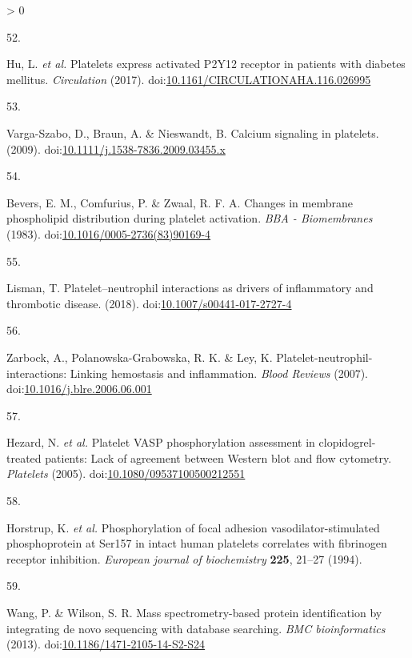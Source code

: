 \documentclass[11pt,twoside]{bristolthesis}
\newlength{\cslhangindent}
\newlength{\csllabelwidth}
\newenvironment{CSLReferences}[2] %
 {%
  \setlength{\parindent}{0pt}
  \ifodd #1 \everypar{\setlength{\hangindent}{\cslhangindent}}\ignorespaces\fi
  \ifnum #2 > 0
  \setlength{\parskip}{#2\baselineskip}
  \fi
 }%
 {}
\newcommand{\CSLLeftMargin}[1]{\parbox[t]{\csllabelwidth}{#1}}
\newcommand{\CSLRightInline}[1]{\parbox[t]{\linewidth - \csllabelwidth}{#1}\break}
\begin{document}
\begin{CSLReferences}{0}{0}
\leavevmode\hypertarget{ref-Hu2017}{}%
\CSLLeftMargin{52. }
\CSLRightInline{Hu, L. \emph{et al.} {Platelets express activated P2Y12 receptor in patients with diabetes mellitus}. \emph{Circulation} (2017). doi:\href{https://doi.org/10.1161/CIRCULATIONAHA.116.026995}{10.1161/CIRCULATIONAHA.116.026995}}

\leavevmode\hypertarget{ref-Varga-Szabo2009}{}%
\CSLLeftMargin{53. }
\CSLRightInline{Varga-Szabo, D., Braun, A. \& Nieswandt, B. {Calcium signaling in platelets}. (2009). doi:\href{https://doi.org/10.1111/j.1538-7836.2009.03455.x}{10.1111/j.1538-7836.2009.03455.x}}

\leavevmode\hypertarget{ref-Bevers1983}{}%
\CSLLeftMargin{54. }
\CSLRightInline{Bevers, E. M., Comfurius, P. \& Zwaal, R. F. A. {Changes in membrane phospholipid distribution during platelet activation}. \emph{BBA - Biomembranes} (1983). doi:\href{https://doi.org/10.1016/0005-2736(83)90169-4}{10.1016/0005-2736(83)90169-4}}

\leavevmode\hypertarget{ref-Lisman2018}{}%
\CSLLeftMargin{55. }
\CSLRightInline{Lisman, T. {Platelet--neutrophil interactions as drivers of inflammatory and thrombotic disease}. (2018). doi:\href{https://doi.org/10.1007/s00441-017-2727-4}{10.1007/s00441-017-2727-4}}

\leavevmode\hypertarget{ref-Zarbock2007}{}%
\CSLLeftMargin{56. }
\CSLRightInline{Zarbock, A., Polanowska-Grabowska, R. K. \& Ley, K. {Platelet-neutrophil-interactions: Linking hemostasis and inflammation}. \emph{Blood Reviews} (2007). doi:\href{https://doi.org/10.1016/j.blre.2006.06.001}{10.1016/j.blre.2006.06.001}}

\leavevmode\hypertarget{ref-Hezard2005}{}%
\CSLLeftMargin{57. }
\CSLRightInline{Hezard, N. \emph{et al.} {Platelet VASP phosphorylation assessment in clopidogrel-treated patients: Lack of agreement between Western blot and flow cytometry}. \emph{Platelets} (2005). doi:\href{https://doi.org/10.1080/09537100500212551}{10.1080/09537100500212551}}

\leavevmode\hypertarget{ref-Horstrup1994}{}%
\CSLLeftMargin{58. }
\CSLRightInline{Horstrup, K. \emph{et al.} {Phosphorylation of focal adhesion vasodilator-stimulated phosphoprotein at Ser157 in intact human platelets correlates with fibrinogen receptor inhibition.} \emph{European journal of biochemistry} \textbf{225}, 21--27 (1994).}

\leavevmode\hypertarget{ref-Wang2013}{}%
\CSLLeftMargin{59. }
\CSLRightInline{Wang, P. \& Wilson, S. R. {Mass spectrometry-based protein identification by integrating de novo sequencing with database searching.} \emph{BMC bioinformatics} (2013). doi:\href{https://doi.org/10.1186/1471-2105-14-S2-S24}{10.1186/1471-2105-14-S2-S24}}


\end{CSLReferences}
\end{document}
